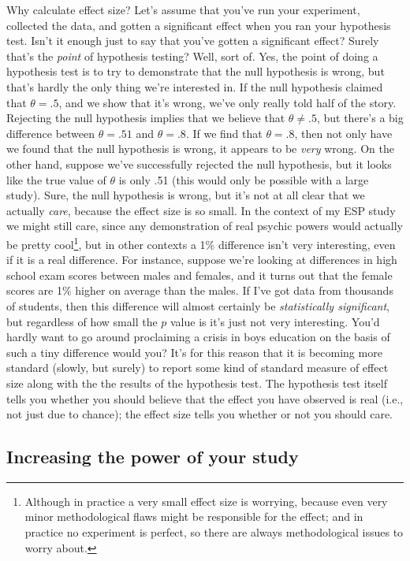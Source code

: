 \documentclass[
]{book}
\begin{document}
Why calculate effect size? Let's assume that you've run your experiment, collected the data, and gotten a significant effect when you ran your hypothesis test. Isn't it enough just to say that you've gotten a significant effect? Surely that's the \emph{point} of hypothesis testing? Well, sort of. Yes, the point of doing a hypothesis test is to try to demonstrate that the null hypothesis is wrong, but that's hardly the only thing we're interested in. If the null hypothesis claimed that \(\theta = .5\), and we show that it's wrong, we've only really told half of the story. Rejecting the null hypothesis implies that we believe that \(\theta \neq .5\), but there's a big difference between \(\theta = .51\) and \(\theta = .8\). If we find that \(\theta = .8\), then not only have we found that the null hypothesis is wrong, it appears to be \emph{very} wrong. On the other hand, suppose we've successfully rejected the null hypothesis, but it looks like the true value of \(\theta\) is only .51 (this would only be possible with a large study). Sure, the null hypothesis is wrong, but it's not at all clear that we actually \emph{care}, because the effect size is so small. In the context of my ESP study we might still care, since any demonstration of real psychic powers would actually be pretty cool\footnote{Although in practice a very small effect size is worrying, because even very minor methodological flaws might be responsible for the effect; and in practice no experiment is perfect, so there are always methodological issues to worry about.}, but in other contexts a 1\% difference isn't very interesting, even if it is a real difference. For instance, suppose we're looking at differences in high school exam scores between males and females, and it turns out that the female scores are 1\% higher on average than the males. If I've got data from thousands of students, then this difference will almost certainly be \emph{statistically significant}, but regardless of how small the \(p\) value is it's just not very interesting. You'd hardly want to go around proclaiming a crisis in boys education on the basis of such a tiny difference would you? It's for this reason that it is becoming more standard (slowly, but surely) to report some kind of standard measure of effect size along with the the results of the hypothesis test. The hypothesis test itself tells you whether you should believe that the effect you have observed is real (i.e., not just due to chance); the effect size tells you whether or not you should care.

\hypertarget{increasing-the-power-of-your-study}{%
\subsection{Increasing the power of your study}\label{increasing-the-power-of-your-study}}
\end{document}

